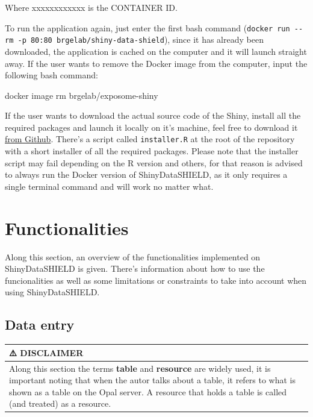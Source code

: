\documentclass[
]{book}
\newenvironment{Shaded}{\begin{snugshade}}{\end{snugshade}}
\newcommand{\ExtensionTok}[1]{#1}
\newcommand{\NormalTok}[1]{#1}
\begin{document}
Where xxxxxxxxxxxx is the CONTAINER ID.

To run the application again, just enter the first bash command (\texttt{docker\ run\ -\/-rm\ -p\ 80:80\ brgelab/shiny-data-shield}), since it has already been downloaded, the application is cached on the computer and it will launch straight away. If the user wants to remove the Docker image from the computer, input the following bash command:

\begin{Shaded}
\begin{Highlighting}[]
\ExtensionTok{docker}\NormalTok{ image rm brgelab/exposome{-}shiny}
\end{Highlighting}
\end{Shaded}

If the user wants to download the actual source code of the Shiny, install all the required packages and launch it locally on it's machine, feel free to download it \href{https://github.com/isglobal-brge/dsOmicsShiny}{from Github}. There's a script called \texttt{installer.R} at the root of the repository with a short installer of all the required packages. Please note that the installer script may fail depending on the R version and others, for that reason is advised to always run the Docker version of ShinyDataSHIELD, as it only requires a single terminal command and will work no matter what.

\hypertarget{functionalities}{%
\chapter{Functionalities}\label{functionalities}}

Along this section, an overview of the functionalities implemented on ShinyDataSHIELD is given. There's information about how to use the funcionalities as well as some limitations or constraints to take into account when using ShinyDataSHIELD.

\hypertarget{data-entry}{%
\section{Data entry}\label{data-entry}}

\begin{longtable}[]{@{}
  >{\raggedright\arraybackslash}p{}@{}}
\toprule
⚠️ DISCLAIMER \\
\midrule
\endhead
Along this section the terms \textbf{table} and \textbf{resource} are widely used, it is important noting that when the autor talks about a table, it refers to what is shown as a table on the Opal server. A resource that holds a table is called (and treated) as a resource. \\
\bottomrule
\end{longtable}
\end{document}
